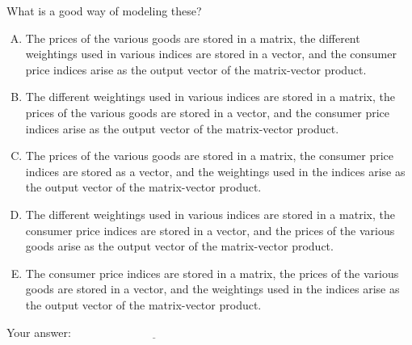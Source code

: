 \documentclass[10pt]{amsart}
\begin{document}
\begin{enumerate}
  What is a good way of modeling these?

  \begin{enumerate}[(A)]
  \item The prices of the various goods are stored in a matrix, the
    different weightings used in various indices are stored in a
    vector, and the consumer price indices arise as the output vector
    of the matrix-vector product.
  \item The different weightings used in various indices are stored in
    a matrix, the prices of the various goods are stored in a vector,
    and the consumer price indices arise as the output vector of the
    matrix-vector product.
  \item The prices of the various goods are stored in a matrix, the
    consumer price indices are stored as a vector, and the weightings
    used in the indices arise as the output vector of the
    matrix-vector product.
  \item The different weightings used in various indices are stored in
    a matrix, the consumer price indices are stored in a vector, and
    the prices of the various goods arise as the output vector of the
    matrix-vector product.
  \item The consumer price indices are stored in a matrix, the prices
    of the various goods are stored in a vector, and the weightings
    used in the indices arise as the output vector of the
    matrix-vector product.
  \end{enumerate}

  \vspace{0.1in}
  Your answer: $\underline{\qquad\qquad\qquad\qquad\qquad\qquad\qquad}$
  \vspace{0.1in}
\end{enumerate}
\end{document}

